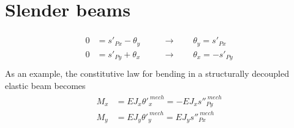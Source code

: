 \documentclass[letterpaper,10pt,english]{jupyterBook}
\begin{document}
\section{Slender beams}
\label{\detokenize{ch/solids/beams/slender:slender-beams}}\label{\detokenize{ch/solids/beams/slender:solid-mechanics-small-displacements-beams-slender}}\label{\detokenize{ch/solids/beams/slender::doc}}
\sphinxAtStartPar
{}
\begin{equation*}
\begin{split}\begin{aligned}
  0 & = s'_{Px} - \theta_y \quad && \rightarrow \qquad \theta_y = s'_{Px}  \\
  0 & = s'_{Py} + \theta_x \quad && \rightarrow \qquad \theta_x =-s'_{Py}  \\
\end{aligned}\end{split}
\end{equation*}
\sphinxAtStartPar
As an example, the constitutive law for bending in a structurally decoupled elastic beam becomes
\begin{equation*}
\begin{split}\begin{aligned}
  M_x & = EJ_x \theta'^{\ mech}_x = - EJ_x s''^{\ mech}_{Py} \\
  M_y & = EJ_y \theta'^{\ mech}_y =   EJ_y s''^{\ mech}_{Px} \\
\end{aligned}\end{split}
\end{equation*}\label{ch/solids/beams/slender:example-0}
\end{document}
